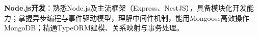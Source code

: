 \item \textbf{Node.js开发}：熟悉Node.js及主流框架（Express、NestJS），具备模块化开发能力；掌握异步编程与事件驱动模型，理解中间件机制，能用Mongoose高效操作MongoDB；精通TypeORM建模、关系映射与事务处理。